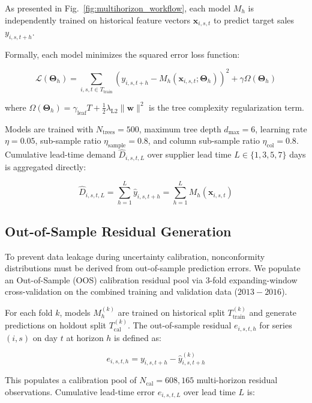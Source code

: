 As presented in Fig.~\ref{fig:multihorizon_workflow}, each model $M_h$ is independently trained on historical feature vectors $\mathbf{x}_{i,s,t}$ to predict target sales $y_{i,s,t+h}$.

Formally, each model minimizes the squared error loss function:

\begin{equation}
\mathcal{L}(\mathbf{\Theta}_h) = \sum_{i,s,t \in T_{\text{train}}} \left( y_{i,s,t+h} - M_h(\mathbf{x}_{i,s,t}; \mathbf{\Theta}_h) \right)^2 + \gamma \Omega(\mathbf{\Theta}_h)
\end{equation}

where $\Omega(\mathbf{\Theta}_h) = \gamma_{\text{leaf}} T + \frac{1}{2} \lambda_{\text{L2}} \|\mathbf{w}\|^2$ is the tree complexity regularization term. 

Models are trained with $N_{\text{trees}} = 500$, maximum tree depth $d_{\text{max}} = 6$, learning rate $\eta = 0.05$, sub-sample ratio $\eta_{\text{sample}} = 0.8$, and column sub-sample ratio $\eta_{\text{col}} = 0.8$. Cumulative lead-time demand $\hat{D}_{i,s,t,L}$ over supplier lead time $L \in \{1, 3, 5, 7\}$ days is aggregated directly:

\begin{equation}
\hat{D}_{i,s,t,L} = \sum_{h=1}^L \hat{y}_{i,s,t+h} = \sum_{h=1}^L M_h(\mathbf{x}_{i,s,t})
\end{equation}

\subsection{Out-of-Sample Residual Generation}
To prevent data leakage during uncertainty calibration, nonconformity distributions must be derived from out-of-sample prediction errors. We populate an Out-of-Sample (OOS) calibration residual pool via 3-fold expanding-window cross-validation on the combined training and validation data ($2013-2016$).

For each fold $k$, models $M_{h}^{(k)}$ are trained on historical split $T_{\text{train}}^{(k)}$ and generate predictions on holdout split $T_{\text{cal}}^{(k)}$. The out-of-sample residual $e_{i,s,t,h}$ for series $(i,s)$ on day $t$ at horizon $h$ is defined as:

\begin{equation}
e_{i,s,t,h} = y_{i,s,t+h} - \hat{y}_{i,s,t+h}^{(k)}
\end{equation}

This populates a calibration pool of $N_{\text{cal}} = 608,165$ multi-horizon residual observations. Cumulative lead-time error $e_{i,s,t,L}$ over lead time $L$ is:

